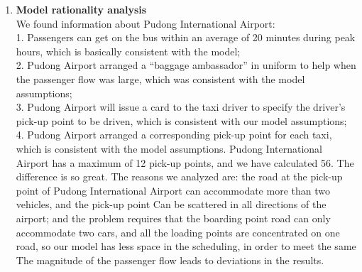 \begin{enumerate}
\item \textbf{Model rationality analysis}\\
We found information about Pudong International Airport:\\
1. Passengers can get on the bus within an average of 20 minutes during peak hours, which is basically consistent with the model;\\
2. Pudong Airport arranged a “baggage ambassador” in uniform to help when the passenger flow was large, which was consistent with the model assumptions;\\
3. Pudong Airport will issue a card to the taxi driver to specify the driver's pick-up point to be driven, which is consistent with our model assumptions;\\
4. Pudong Airport arranged a corresponding pick-up point for each taxi, which is consistent with the model assumptions. Pudong International Airport has a maximum of 12 pick-up points, and we have calculated 56. The difference is so great. The reasons we analyzed are: the road at the pick-up point of Pudong International Airport can accommodate more than two vehicles, and the pick-up point Can be scattered in all directions of the airport; and the problem requires that the boarding point road can only accommodate two cars, and all the loading points are concentrated on one road, so our model has less space in the scheduling, in order to meet the same The magnitude of the passenger flow leads to deviations in the results.

\end{enumerate}



